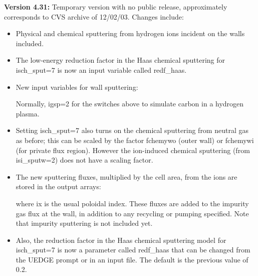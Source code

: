 \documentclass [12pt]{article}
\def\hsa{\hskip.4truein}
\def\hsp6{\hskip.6truein}
\begin{document}
\noindent\textbf{Version 4.31:} Temporary version with no public release, 
approximately corresponds to CVS archive of 12/02/03.  Changes include:
\begin{itemize}
  \item Physical and chemical sputtering from hydrogen ions incident
          on the walls included.
  \item The low-energy reduction factor in the Haas chemical
          sputtering for isch\_sput=7 is now an input variable called
          redf\_haas.
  \item New input variables for wall sputtering:
{\sf
{}
}
          Normally, igsp=2 for the switches above to simulate carbon
          in a hydrogen plasma.
  \item Setting isch\_sput=7 also turns on the chemical sputtering
          from neutral gas as before; this can be scaled by the factor
          fchemywo (outer wall) or fchemywi (for private flux region).
          However the ion-induced chemical sputtering (from
          isi\_sputw=2) does not have a scaling factor.
  \item The new sputtering fluxes, multiplied by the cell area, from
          the ions are stored in the output arrays:
{\sf
{}
} 
where {\sf ix} is the usual poloidal index.  These fluxes are added to the
impurity gas flux at the wall, in addition to any recycling or pumping
specified.  Note that impurity sputtering is not included yet.

  \item Also, the reduction factor in the Haas chemical sputtering
          model for isch\_sput=7 is now a parameter called redf\_haas
          that can be changed from the UEDGE prompt or in an input
          file.  The default is the previous value of 0.2.
\end{itemize}
\end{document}
